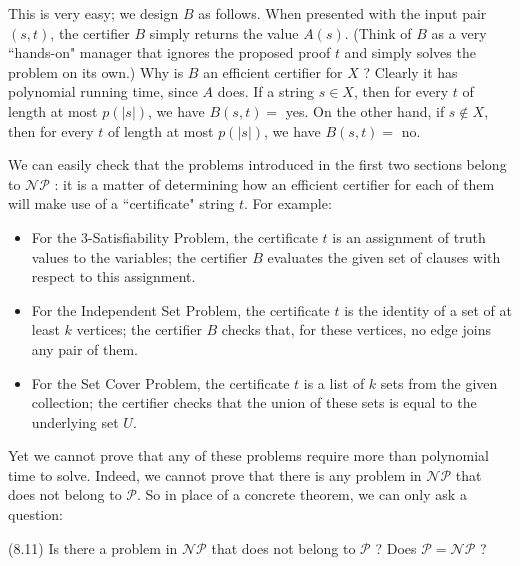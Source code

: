 \documentclass[a4paper, 12pt]{book}
\theoremstyle{dotless}
\begin{document}
This is very easy; we design $B$ as follows. When presented with the input pair $(s, t)$, the certifier $B$ simply returns the value $A(s)$. (Think of $B$ as a very ``hands-on" manager that ignores the proposed proof $t$ and simply solves the problem on its own.) Why is $B$ an efficient certifier for $X$ ? Clearly it has polynomial running time, since $A$ does. If a string $s \in X$, then for every $t$ of length at most $p(|s|)$, we have $B(s, t)=$ yes. On the other hand, if $s \notin X$, then for every $t$ of length at most $p(|s|)$, we have $B(s, t)=$ no.

We can easily check that the problems introduced in the first two sections belong to $\mathcal{N P}$ : it is a matter of determining how an efficient certifier for each of them will make use of a ``certificate" string $t$. For example:

\begin{itemize}
  \item For the 3-Satisfiability Problem, the certificate $t$ is an assignment of truth values to the variables; the certifier $B$ evaluates the given set of clauses with respect to this assignment.

  \item For the Independent Set Problem, the certificate $t$ is the identity of a set of at least $k$ vertices; the certifier $B$ checks that, for these vertices, no edge joins any pair of them.

  \item For the Set Cover Problem, the certificate $t$ is a list of $k$ sets from the given collection; the certifier checks that the union of these sets is equal to the underlying set $U$.

\end{itemize}

Yet we cannot prove that any of these problems require more than polynomial time to solve. Indeed, we cannot prove that there is any problem in $\mathcal{N} \mathcal{P}$ that does not belong to $\mathcal{P}$. So in place of a concrete theorem, we can only ask a question:

(8.11) Is there a problem in $\mathcal{N} \mathcal{P}$ that does not belong to $\mathcal{P}$ ? Does $\mathcal{P}=\mathcal{N} \mathcal{P}$ ?
\end{document}
